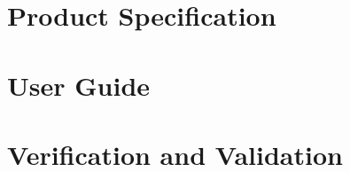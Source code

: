 

\chapter{Product Specification}\label{ch:spec}

\chapter{User Guide}\label{ch:user}


\chapter{Verification and Validation}\label{ch:ivv}

